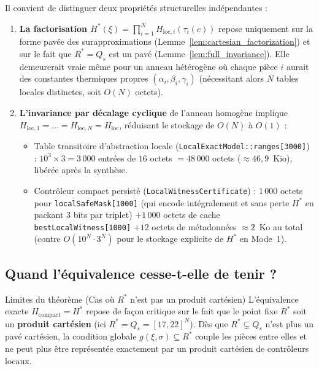 \documentclass[11pt,a4paper]{article}
\theoremstyle{definition}
\theoremstyle{plain}
\newcommand{\code}[1]{\texttt{#1}}
\begin{document}
Il convient de distinguer deux propriétés structurelles indépendantes :
\begin{enumerate}[label=\textbf{\arabic*.}]
  \item \textbf{La factorisation $H^*(\xi) = \prod_{i=1}^N H_{\mathrm{loc},i}(\tau_i(c))$} repose uniquement sur la forme pavée des surapproximations (Lemme~\ref{lem:cartesian_factorization}) et sur le fait que $R^* = Q_s$ est un pavé (Lemme~\ref{lem:full_invariance}). Elle demeurerait vraie même pour un anneau hétérogène où chaque pièce $i$ aurait des constantes thermiques propres $(\alpha_i, \beta_i, \gamma_i)$ (nécessitant alors $N$ tables locales distinctes, soit $O(N)$ octets).
  \item \textbf{L'invariance par décalage cyclique} de l'anneau homogène implique $H_{\mathrm{loc},1} = \dots = H_{\mathrm{loc},N} = H_{\mathrm{loc}}$, réduisant le stockage de $O(N)$ à \textbf{$O(1)$} :
  \begin{itemize}[nosep]
    \item Table transitoire d'abstraction locale (\code{LocalExactModel::ranges[3000]}) : $10^3 \times 3 = 3\,000$ entrées de $16$ octets $= 48\,000$ octets ($\approx 46{,}9$~Kio), libérée après la synthèse.
    \item Contrôleur compact persisté (\code{LocalWitnessCertificate}) : $1\,000$ octets pour \code{localSafeMask[1000]} (qui encode intégralement et sans perte $H^*$ en packant $3$ bits par triplet) $+ 1\,000$ octets de cache \code{bestLocalWitness[1000]} $+ 12$ octets de métadonnées $\approx 2$~Ko au total (contre $O(10^N \cdot 3^N)$ pour le stockage explicite de $H^*$ en Mode~1).
  \end{itemize}
\end{enumerate}

\subsection{Quand l'équivalence cesse-t-elle de tenir ?}

\begin{encadre}[warn]{Limites du théorème (Cas où $R^*$ n'est pas un produit cartésien)}
L'équivalence exacte $H_{\mathrm{compact}} = H^*$ repose de façon critique sur le fait que le point fixe $R^*$ soit un \textbf{produit cartésien} (ici $R^* = Q_s = [17, 22]^N$). Dès que $R^* \subsetneq Q_s$ n'est plus un pavé cartésien, la condition globale $g(\xi, \sigma) \subseteq R^*$ couple les pièces entre elles et ne peut plus être représentée exactement par un produit cartésien de contrôleurs locaux.
\end{encadre}
\end{document}
